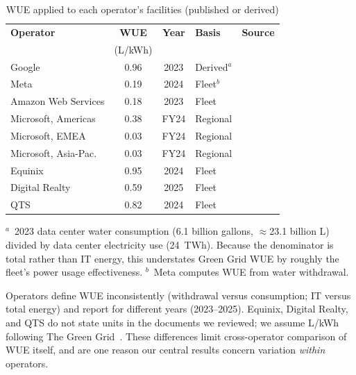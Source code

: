 \documentclass[conference,10pt]{IEEEtran}
\begin{document}
\begin{table}[t]
\centering
\caption{WUE applied to each operator's facilities (published or derived)}
\label{tab:wue}
\small
\setlength{\tabcolsep}{4pt}
\begin{tabular}{@{}lccll@{}}
\toprule
\textbf{Operator} & \textbf{WUE} & \textbf{Year} & \textbf{Basis} & \textbf{Source} \\
 & (L/kWh) & & & \\
\midrule
Google              & 0.96 & 2023 & Derived$^{a}$  & \cite{google2024envreport} \\
Meta                & 0.19 & 2024 & Fleet$^{b}$    & \cite{meta2025edi} \\
Amazon Web Services & 0.18 & 2023 & Fleet          & \cite{aws2023summary} \\
Microsoft, Americas & 0.38 & FY24 & Regional       & \cite{microsoft2025efficiency} \\
Microsoft, EMEA     & 0.03 & FY24 & Regional       & \cite{microsoft2025efficiency} \\
Microsoft, Asia-Pac.& 0.03 & FY24 & Regional       & \cite{microsoft2025efficiency} \\
Equinix             & 0.95 & 2024 & Fleet          & \cite{equinix2024datasummary} \\
Digital Realty      & 0.59 & 2025 & Fleet          & \cite{digitalrealty2025impact} \\
QTS                 & 0.82 & 2024 & Fleet          & \cite{qts2024sustain} \\
\bottomrule
\end{tabular}
\vspace{3pt}

\parbox{\columnwidth}{\footnotesize
$^{a}$~2023 data center water consumption (6.1 billion gallons,
$\approx$23.1 billion L) divided by data center electricity use (24~TWh).
Because the denominator is total rather than IT energy, this understates
Green Grid WUE by roughly the fleet's power usage effectiveness.
$^{b}$~Meta computes WUE from water withdrawal.}
\end{table}

Operators define WUE inconsistently (withdrawal versus consumption; IT
versus total energy) and report for different years (2023--2025). Equinix,
Digital Realty, and QTS do not state units in the documents we reviewed; we
assume L/kWh following The Green Grid~\cite{greengrid2011wue}. These
differences limit cross-operator comparison of WUE itself, and are one
reason our central results concern variation \emph{within} operators.
\end{document}
